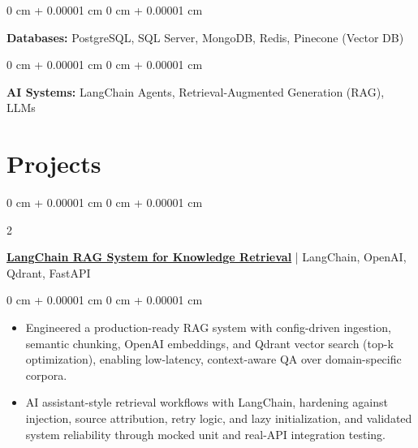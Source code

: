 \documentclass[10pt, letterpaper]{article}
\newenvironment{highlights}{
    \begin{itemize}[
        topsep=0.10 cm,
        parsep=0.10 cm,
        partopsep=0pt,
        itemsep=0pt,
        leftmargin=0 cm + 10pt
    ]
}{
    \end{itemize}
} %
\newenvironment{onecolentry}{
    \begin{adjustwidth}{
        0 cm + 0.00001 cm
    }{
        0 cm + 0.00001 cm
    }
}{
    \end{adjustwidth}
} %
\newenvironment{twocolentry}[2][]{
    \onecolentry
    \def\secondColumn{#2}
    \setcolumnwidth{\fill, 4.5 cm}
    \begin{paracol}{2}
}{
    \switchcolumn \raggedleft \secondColumn
    \end{paracol}
    \endonecolentry
} %
\renewenvironment{highlights}{
    \begin{itemize}[
        topsep=0.05cm,
        parsep=0.10cm,
        partopsep=1pt,
        itemsep=0pt,
        leftmargin=0cm + 10pt
    ]
}{
    \end{itemize}
}
\begin{document}
\vspace{0.1cm}

\begin{onecolentry}
\textbf{Databases:} PostgreSQL, SQL Server, MongoDB, Redis, Pinecone (Vector DB)
\end{onecolentry}

\vspace{0.1cm}

\begin{onecolentry}
\textbf{AI Systems:} LangChain Agents, Retrieval-Augmented Generation (RAG), LLMs
\end{onecolentry}

\section{Projects}



\begin{twocolentry}{2026}
\textbf{\href{https://github.com/notquite28/langchain-rag}{LangChain RAG System for Knowledge Retrieval}} | LangChain, OpenAI, Qdrant, FastAPI
\end{twocolentry}
\vspace{0.05cm}
\begin{onecolentry}
\begin{highlights}
\item Engineered a production-ready RAG system with config-driven ingestion, semantic chunking, OpenAI embeddings, and Qdrant vector search (top-k optimization), enabling low-latency, context-aware QA over domain-specific corpora.
\item AI assistant-style retrieval workflows with LangChain, hardening against injection, source attribution, retry logic, and lazy initialization, and validated system reliability through mocked unit and real-API integration testing.
\end{highlights}
\end{onecolentry}
\vspace{0.3cm}
\end{document}
